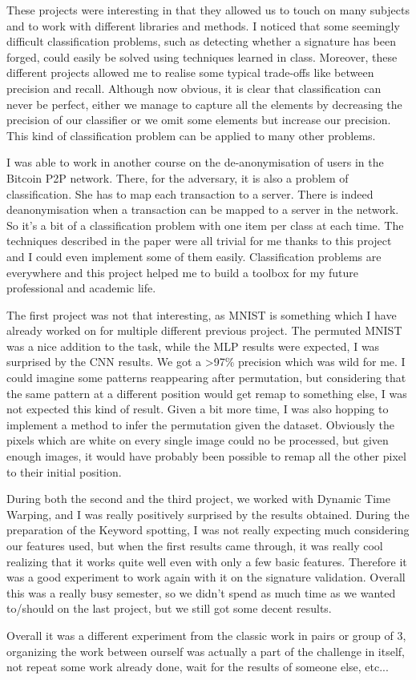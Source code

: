 \documentclass{homework}
\begin{document}
These projects were interesting in that they allowed us to touch on many subjects and to work with different libraries and methods. I noticed that some seemingly difficult classification problems, such as detecting whether a signature has been forged, could easily be solved using techniques learned in class. Moreover, these different projects allowed me to realise some typical trade-offs like between precision and recall. Although now obvious, it is clear that classification can never be perfect, either we manage to capture all the elements by decreasing the precision of our classifier or we omit some elements but increase our precision. This kind of classification problem can be applied to many other problems.

I was able to work in another course on the de-anonymisation of users in the Bitcoin P2P network. There, for the adversary, it is also a problem of classification. She has to map each transaction to a server. There is indeed deanonymisation when a transaction can be mapped to a server in the network. So it's a bit of a classification problem with one item per class at each time. The techniques described in the paper were all trivial for me thanks to this project and I could even implement some of them easily. Classification problems are everywhere and this project helped me to build a toolbox for my future professional and academic life.

The first project was not that interesting, as MNIST is something which I have already worked on for multiple different previous project. The permuted MNIST was a nice addition to the task, while the MLP results were expected, I was surprised by the CNN results. We got a >97\% precision which was wild for me. I could imagine some patterns reappearing after permutation, but considering that the same pattern at a different position would get remap to something else, I was not expected this kind of result. Given a bit more time, I was also hopping to implement a method to infer the permutation given the dataset. Obviously the pixels which are white on every single image could no be processed, but given enough images, it would have probably been possible to remap all the other pixel to their initial position. 

During both the second and the third project, we worked with Dynamic Time Warping, and I was really positively surprised by the results obtained. During the preparation of the Keyword spotting, I was not really expecting much considering our features used, but when the first results came through, it was really cool realizing that it works quite well even with only a few basic features. Therefore it was a good experiment to work again with it on the signature validation. Overall this was a really busy semester, so we didn't spend as much time as we wanted to/should on the last project, but we still got some decent results.

Overall it was a different experiment from the classic work in pairs or group of 3, organizing the work between ourself was actually a part of the challenge in itself, not repeat some work already done, wait for the results of someone else, etc... 
\end{document}
